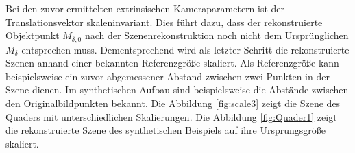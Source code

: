 Bei den zuvor ermittelten extrinsischen Kameraparametern ist der Translationsvektor skaleninvariant. Dies führt dazu, dass der rekonstruierte Objektpunkt $M_{\delta,0}$ nach der Szenenrekonstruktion noch nicht dem Ursprünglichen $M_\delta$ entsprechen muss. Dementsprechend wird als letzter Schritt die rekonstruierte Szenen anhand einer bekannten Referenzgröße skaliert. Als Referenzgröße kann beispielsweise ein zuvor abgemessener Abstand zwischen zwei Punkten in der Szene dienen. Im synthetischen Aufbau sind beispielsweise die Abstände zwischen den Originalbildpunkten bekannt. Die Abbildung \ref{fig:scale3} zeigt die Szene des Quaders mit unterschiedlichen Skalierungen. Die Abbildung \ref{fig:Quader1} zeigt die rekonstruierte Szene des synthetischen Beispiels auf ihre Ursprungsgröße skaliert.

%
%


